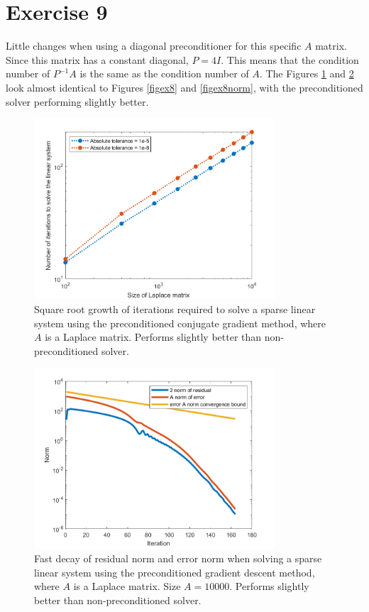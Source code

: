 \documentclass{article}
\begin{document}
\section*{Exercise 9}
Little changes when using a diagonal preconditioner for this specific $A$ matrix.
Since this matrix has a constant diagonal, $P=4I$. This means that the condition number of $P^{-1}A$ is the same as the condition number of $A$. The Figures \ref{figex9} and \ref{figex9norm} look almost identical to Figures \ref{figex8} and \ref{figex8norm}, with the preconditioned solver performing slightly better.
\begin{figure}
	\centering
	\includegraphics[width=0.8\textwidth]{ex9.png}
	\caption{Square root growth of iterations required to solve a sparse linear system using the preconditioned conjugate gradient method,  where $A$ is a Laplace matrix. Performs slightly better than non-preconditioned solver.}
	\label{figex9}
\end{figure}
\begin{figure}[h]
	\centering
	\includegraphics[width=0.8\textwidth]{ex9_norm.png}
	\caption{Fast decay of residual norm and error norm when solving a sparse linear system using the preconditioned gradient descent method, where $A$ is a Laplace matrix. Size $A = 10000$. Performs slightly better than non-preconditioned solver.}
	\label{figex9norm}
\end{figure}
\end{document}
